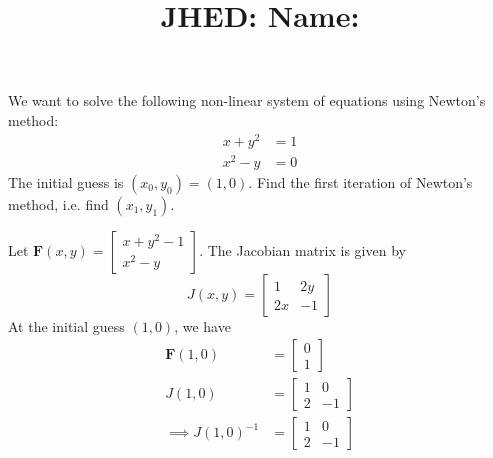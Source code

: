 \documentclass[reqno, answers]{exam}
\title{\normalsize{
  JHED: \underline{\hspace{4cm}} \hspace{1em} Name: \underline{\hspace{9cm}}}
   }
\author{}
\date{}
\begin{document}
\maketitle
\vspace{-2cm} %

\begin{questions}


  \question[10]
  We want to solve the following non-linear system of equations using Newton's method:
  \begin{align*}
    x + y^2 & = 1 \\
    x^2 - y & = 0
  \end{align*}
  The initial guess is $(x_0, y_0) = (1, 0)$. Find the first iteration of Newton's method, i.e. find $(x_1, y_1)$.

  \begin{solution}
    Let $\mathbf{F}(x, y) = \begin{bmatrix} x + y^2 - 1 \\ x^2 - y \end{bmatrix}$. The Jacobian matrix is given by
    \[J(x, y) = \begin{bmatrix} 1 & 2y \\ 2x & -1 \end{bmatrix}\]
    At the initial guess $(1, 0)$, we have
    \begin{align*}
      \mathbf{F}(1, 0) & = \begin{bmatrix} 0 \\ 1 \end{bmatrix}          \\
      J(1, 0)          & = \begin{bmatrix} 1 & 0 \\ 2 & -1 \end{bmatrix} \\
      \implies
      J(1, 0)^{-1}     & = \begin{bmatrix} 1 & 0 \\ 2 & -1 \end{bmatrix}
    \end{align*}


\end{solution}
\end{questions}
\end{document}
